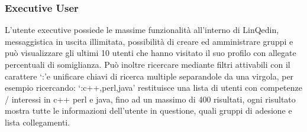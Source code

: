 \subsubsection*{Executive User}
L'utente executive possiede le massime funzionalità all'interno di LinQedin, messaggistica in uscita illimitata, possibilità di creare ed amministrare gruppi e può visualizzare
gli ultimi 10 utenti che hanno visitato il suo profilo con allegate percentuali di somiglianza.
Può inoltre ricercare mediante filtri attivabili con il carattere \lq:\rq e unificare chiavi di ricerca multiple separandole da una virgola, per esempio ricercando: \lq:c++,perl,java\rq
restituisce una lista di utenti con competenze / interessi in c++ perl e java, fino ad un massimo di 400 risultati, ogni risultato mostra tutte le informazioni dell'utente in questione,
quali gruppi di adesione e lista collegamenti.